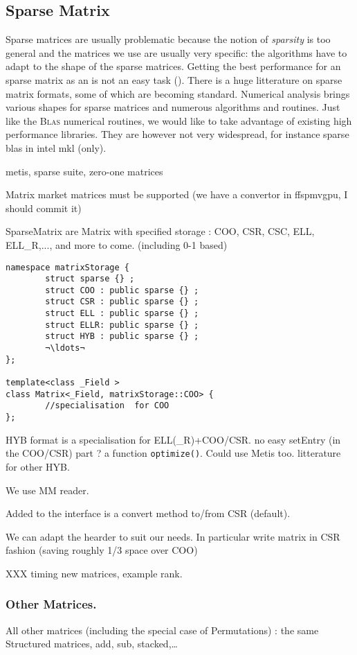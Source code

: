 \subsection{Sparse Matrix}
%
Sparse matrices are usually problematic because the notion of \emph{sparsity} is too general and the matrices
we use are usually very specific: the algorithms have to adapt to the shape of the sparse matrices.
Getting the best performance for an sparse matrix as an \applin is not an easy task
(\cf \cite{Boyer:2010:spmv}). There is a huge litterature
on sparse matrix formats, some of which are becoming standard. Numerical
analysis brings various shapes for sparse matrices and numerous algorithms and
routines.  Just like the \textsc{Blas} numerical routines, we would like to
take advantage of existing high performance libraries. They are however not very widespread, for instance
sparse blas in intel mkl (only).
%
\par
%
\danger  metis, sparse suite, zero-one matrices
%
\par
%
Matrix market matrices must be supported (we have a convertor in ffspmvgpu, I should commit it)
%
\par
%
SparseMatrix are Matrix with specified storage : COO, CSR, CSC, ELL,
ELL\_R,..., and more to come. (including 0-1 based)
%
\par
%
{
\def\indexTrait{other}
\begin{lstlisting}
namespace matrixStorage {
        struct sparse {} ;
        struct COO : public sparse {} ;
        struct CSR : public sparse {} ;
        struct ELL : public sparse {} ;
        struct ELLR: public sparse {} ;
        struct HYB : public sparse {} ;
        ¬\ldots¬
};

template<class _Field >
class Matrix<_Field, matrixStorage::COO> {
        //specialisation  for COO
};
\end{lstlisting}
}

%
\par
 HYB format is a specialisation for ELL(\_R)+COO/CSR. no easy setEntry (in the
COO/CSR) part ? a function \texttt{optimize()}. Could use \textsf{Metis} too.
litterature for other HYB.
\par
We use MM reader.
\par
Added to the interface is a convert method to/from CSR (default).
%
\par
%
We can adapt the hearder to suit our needs. In particular write matrix in CSR
fashion (saving roughly 1/3 space over COO)
%
\par
%
XXX timing new matrices, example rank.
%
\subsubsection{Other Matrices.}
%
All other matrices (including the special case of Permutations) : the same
Structured matrices, add, sub, stacked,\dots
%


